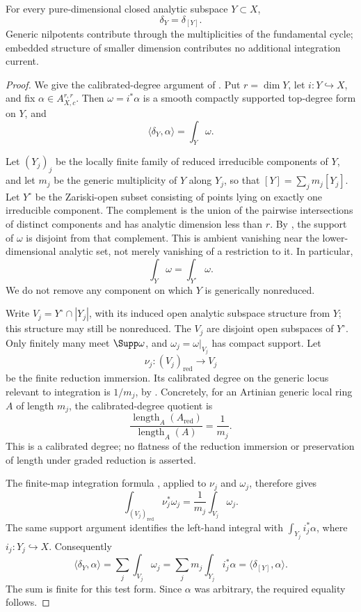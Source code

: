 \begin{theorem}
\label{thm:current-fundamental-cycle}
For every pure-dimensional closed analytic subspace $Y\subset X$,
\[
                         \delta_Y=\delta_{[Y]}.
\]
Generic nilpotents contribute through the multiplicities of the fundamental
cycle; embedded structure of smaller dimension contributes no additional
integration current.
\end{theorem}
\begin{proof}
We give the calibrated-degree argument of
\cite[Proposition~16.6.3]{CLD25}.  Put $r=\dim Y$, let
$i:Y\hookrightarrow X$, and fix $\alpha\in A_{X,c}^{r,r}$.
Then $\omega=i^*\alpha$ is a smooth compactly supported top-degree
form on $Y$, and
\[
                         \langle\delta_Y,\alpha\rangle=\int_Y\omega.
\]

Let $(Y_j)_j$ be the locally finite family of reduced irreducible
components of $Y$, and let $m_j$ be the generic multiplicity of $Y$
along $Y_j$, so that $[Y]=\sum_jm_j[Y_j]$.
Let $Y^\circ$ be the Zariski-open subset consisting of points lying
on exactly one irreducible component.  The complement is the union
of the pairwise intersections of distinct components and has analytic
dimension less than $r$.  By
\cite[Proposition~15.2.1(b)]{CLD25}, the support of $\omega$ is
disjoint from that complement.  This is ambient vanishing near the
lower-dimensional analytic set, not merely vanishing of a restriction
to it.  In particular,
\[
                         \int_Y\omega=\int_{Y^\circ}\omega.
\]
We do not remove any component on which $Y$ is generically nonreduced.

Write $V_j=Y^\circ\cap |Y_j|$, with its induced open analytic subspace
structure from $Y$; this structure may still be nonreduced.
The $V_j$ are disjoint open subspaces of $Y^\circ$.
Only finitely many meet $\Supp\omega$, and $\omega_j=\omega|_{V_j}$
has compact support.  Let
\[
                       \nu_j:(V_j)_{\mathrm{red}}\longrightarrow V_j
\]
be the finite reduction immersion.  Its calibrated degree on the
generic locus relevant to integration is $1/m_j$, by
\cite[Proposition~13.3.7]{CLD25}.  Concretely, for an Artinian generic
local ring $A$ of length $m_j$, the calibrated-degree quotient is
\[
                  \frac{\operatorname{length}_A(A_{\mathrm{red}})}
                       {\operatorname{length}_A(A)}
                       =\frac{1}{m_j}.
\]
This is a calibrated degree; no flatness of the reduction immersion
or preservation of length under graded reduction is asserted.

The finite-map integration formula
\cite[Proposition~15.4.3]{CLD25}, applied to $\nu_j$ and $\omega_j$,
therefore gives
\[
             \int_{(V_j)_{\mathrm{red}}}\nu_j^*\omega_j
                          =\frac1{m_j}\int_{V_j}\omega_j.
\]
The same support argument identifies the left-hand integral with
$\int_{Y_j}i_j^*\alpha$, where $i_j:Y_j\hookrightarrow X$.
Consequently
\[
 \langle\delta_Y,\alpha\rangle
   =\sum_j\int_{V_j}\omega_j
   =\sum_jm_j\int_{Y_j}i_j^*\alpha
   =\langle\delta_{[Y]},\alpha\rangle.
\]
The sum is finite for this test form.  Since $\alpha$ was arbitrary,
the required equality follows.
\end{proof}

